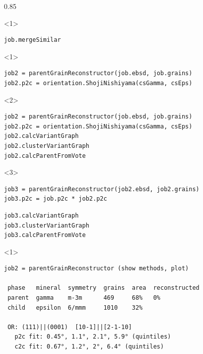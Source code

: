 \documentclass[compress,aspectratio=1610,fleqn,10pt]{beamer}
\begin{document}
\begin{frame}[fragile]
\begin{overlayarea}{\textwidth}{0.85\textheight}
    \begin{onlyenv}<1>
\begin{lstlisting}[style=input]
job.mergeSimilar
\end{lstlisting}
      \vspace{-0.4cm}
    \end{onlyenv}
    \begin{onlyenv}<1>
\begin{lstlisting}[style=input]
job2 = parentGrainReconstructor(job.ebsd, job.grains)
job2.p2c = orientation.ShojiNishiyama(csGamma, csEps)
\end{lstlisting}
    \end{onlyenv}
    \begin{onlyenv}<2>
\begin{lstlisting}[style=input]
job2 = parentGrainReconstructor(job.ebsd, job.grains)
job2.p2c = orientation.ShojiNishiyama(csGamma, csEps)
job2.calcVariantGraph
job2.clusterVariantGraph
job2.calcParentFromVote
\end{lstlisting}
    \end{onlyenv}
    \begin{onlyenv}<3>
\begin{lstlisting}[style=input]
job3 = parentGrainReconstructor(job2.ebsd, job2.grains)
job3.p2c = job.p2c * job2.p2c
\end{lstlisting}
\vspace{-0.4cm}
\begin{lstlisting}[style=input]
job3.calcVariantGraph
job3.clusterVariantGraph
job3.calcParentFromVote
\end{lstlisting}
    \end{onlyenv}
    \begin{onlyenv}<1>
      \vspace{-0.4cm}
\begin{lstlisting}[style=output]
job2 = parentGrainReconstructor (show methods, plot)

 phase   mineral  symmetry  grains  area  reconstructed
 parent  gamma    m-3m      469     68%   0%
 child   epsilon  6/mmm     1010    32%

 OR: (111)||(0001)  [10-1]||[2-1-10]
   p2c fit: 0.45°, 1.1°, 2.1°, 5.9° (quintiles)
   c2c fit: 0.67°, 1.2°, 2°, 6.4° (quintiles)
\end{lstlisting}
        \end{onlyenv}
              \vspace{-0.4cm}


\end{overlayarea}
\end{frame}
\end{document}

